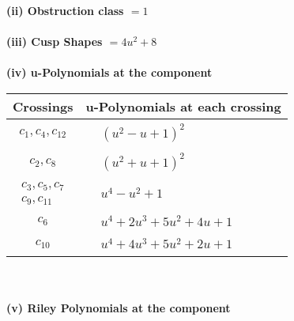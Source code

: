 \documentclass[1p]{elsarticle_modified}
\theoremstyle{definition}
\begin{document}
\flushleft \textbf{(ii) Obstruction class $= 1$}\\~\\
\flushleft \textbf{(iii) Cusp Shapes $= 4 u^2+8$}\\~\\
\newpage\renewcommand{\arraystretch}{1}
\flushleft \textbf{(iv) u-Polynomials at the component}\newline \\
\begin{tabular}{m{50pt}|m{274pt}}
Crossings & \hspace{64pt}u-Polynomials at each crossing \\
\hline $$\begin{aligned}c_{1},c_{4},c_{12}\end{aligned}$$&$\begin{aligned}
&(u^2- u+1)^2
\end{aligned}$\\
\hline $$\begin{aligned}c_{2},c_{8}\end{aligned}$$&$\begin{aligned}
&(u^2+u+1)^2
\end{aligned}$\\
\hline $$\begin{aligned}c_{3},c_{5},c_{7}\\c_{9},c_{11}\end{aligned}$$&$\begin{aligned}
&u^4- u^2+1
\end{aligned}$\\
\hline $$\begin{aligned}c_{6}\end{aligned}$$&$\begin{aligned}
&u^4+2 u^3+5 u^2+4 u+1
\end{aligned}$\\
\hline $$\begin{aligned}c_{10}\end{aligned}$$&$\begin{aligned}
&u^4+4 u^3+5 u^2+2 u+1
\end{aligned}$\\
\hline
\end{tabular}\\~\\
\newpage\renewcommand{\arraystretch}{1}
\flushleft \textbf{(v) Riley Polynomials at the component}\newline \\
\end{document}

